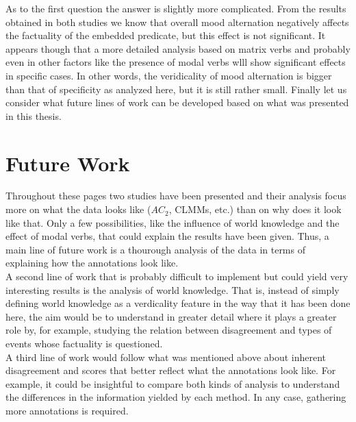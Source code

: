 As to the first question the answer is slightly more complicated. From the results obtained in both studies we know that overall mood alternation negatively affects the factuality of the embedded predicate, but this effect is not significant. It appears though that a more detailed analysis based on matrix verbs and probably even in other factors like the presence of modal verbs wlll show significant effects in specific cases. In other words, the veridicality of mood alternation is bigger than that of specificity as analyzed here, but it is still rather small. Finally let us consider what future lines of work can be developed based on what was presented in this thesis.\\

\section{Future Work}
Throughout these pages two studies have been presented and their analysis focus more on what the data looks like ($AC_2$, CLMMs, etc.) than on why does it look like that. Only a few possibilities, like the influence of world knowledge and the effect of modal verbs, that could explain the results have been given. Thus, a main line of future work is a thourough analysis of the data in terms of explaining how the annotations look like.\\

A second line of work that is probably difficult to implement but could yield very interesting results is the analysis of world knowledge. That is, instead of simply defining world knowledge as a verdicality feature in the way that it has been done here, the aim would be to understand in greater detail where it plays a greater role by, for example, studying the relation between disagreement and types of events whose factuality is questioned.\\ 

A third line of work would follow what was mentioned above about inherent disagreement and scores that better reflect what the annotations look like. For example, it could be insightful to compare both kinds of analysis to understand the differences in the information yielded by each method. In any case, gathering more annotations is required.\\

